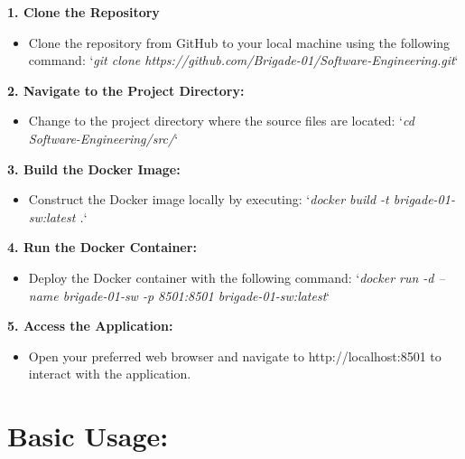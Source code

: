 \documentclass[unnumsec,webpdf,contemporary,large]{oup-authoring-template}%
\theoremstyle{thmstyleone}%
\theoremstyle{thmstyletwo}%
\theoremstyle{thmstylethree}%
\begin{document}
\textbf{1. Clone the Repository}
\vspace{0.2cm}

\begin{itemize}
    \item Clone the repository from GitHub to your local machine using the following command: `\textit{git clone https://github.com/Brigade-01/Software-Engineering.git}`
\end{itemize}
\vspace{0.2cm}

\textbf{2. Navigate to the Project Directory:}
\vspace{0.2cm}

\begin{itemize}
    \item Change to the project directory where the source files are located: `\textit{cd Software-Engineering/src/}`
\end{itemize}
\vspace{0.2cm}

\textbf{3. Build the Docker Image:}
\vspace{0.2cm}

\begin{itemize}
    \item Construct the Docker image locally by executing: `\textit{docker build -t brigade-01-sw:latest .}`
\end{itemize}
\vspace{0.2cm}

\textbf{4. Run the Docker Container:}
\vspace{0.2cm}

\begin{itemize}
    \item Deploy the Docker container with the following command: `\textit{docker run -d --name brigade-01-sw -p 8501:8501 brigade-01-sw:latest}`
\end{itemize}
\vspace{0.2cm}

\textbf{5. Access the Application:}
\vspace{0.2cm}

\begin{itemize}
    \item Open your preferred web browser and navigate to http://localhost:8501 to interact with the application.
\end{itemize}
\vspace{0.2cm}

\section{Basic Usage:}\label{sec3}
\vspace{0.2cm}
\end{document}
